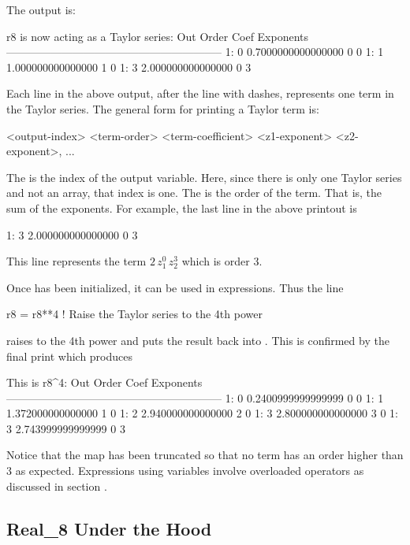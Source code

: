\documentclass{hitec}     %
\begin{document}
The output is:
\begin{example}
r8 is now acting as a Taylor series:
Out  Order  Coef                     Exponents
-----------------------------------------------------------
  1:     0  0.7000000000000000       0  0
  1:     1   1.000000000000000       1  0
  1:     3   2.000000000000000       0  3
\end{example}
Each line in the above output, after the line with dashes, represents one term in the Taylor
series. The general form for printing a Taylor term is:
\begin{example}
  <output-index> <term-order>   <term-coefficient>    <z1-exponent>  <z2-exponent>, ...
\end{example}
The  is the index of the output variable. Here, since there is only one Taylor
series and not an array, that index is one.  The  is the order of the term. That is, the
sum of the exponents. For example, the last line in the above printout is
\begin{example}
  1:     3   2.000000000000000       0  3
\end{example}
This line represents the term $2 \, z_1^0 \, z_2^3$ which is order 3. 

Once  has been initialized, it can be used in expressions. Thus the line
\begin{example}
  r8 = r8**4  ! Raise the Taylor series to the 4th power
\end{example}
raises  to the 4th power and puts the result back into . This is confirmed by the
final print which produces
\begin{example}
This is r8^4:
Out  Order  Coef                     Exponents
-----------------------------------------------------------
  1:     0  0.2400999999999999       0  0
  1:     1   1.372000000000000       1  0
  1:     2   2.940000000000000       2  0
  1:     3   2.800000000000000       3  0
  1:     3   2.743999999999999       0  3
\end{example}
Notice that the map has been truncated so that no term has an order higher than 3 as
expected. Expressions using  variables involve overloaded operators as discussed in
section .

\subsection{Real\_8 Under the Hood}\label{sec:real8}
\end{document}
